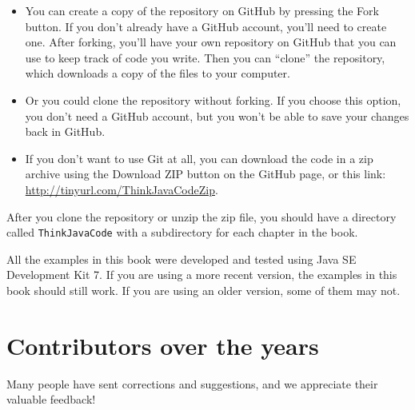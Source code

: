 \documentclass[12pt]{book}
\theoremstyle{exercise}
\begin{document}
\begin{itemize}

\item You can create a copy of the repository on GitHub by pressing the {\sf Fork} button.
If you don't already have a GitHub account, you'll need to create one.
After forking, you'll have your own repository on GitHub that you can use to keep track of code you write.
Then you can ``clone'' the repository, which downloads a copy of the files to your computer.


\item Or you could clone the repository without forking.
If you choose this option, you don't need a GitHub account, but you won't be able to save your changes back in GitHub.


\item If you don't want to use Git at all, you can download the code in a zip archive using the {\sf Download ZIP} button on the GitHub page, or this link:
\url{http://tinyurl.com/ThinkJavaCodeZip}.

\end{itemize}

After you clone the repository or unzip the zip file, you should have a directory called {\tt ThinkJavaCode} with a subdirectory for each chapter in the book.

All the examples in this book were developed and tested using Java SE Development Kit 7.
If you are using a more recent version, the examples in this book should still work.
If you are using an older version, some of them may not.


\section*{Contributors over the years}


Many people have sent corrections and suggestions, and we appreciate their valuable feedback!
\end{document}
